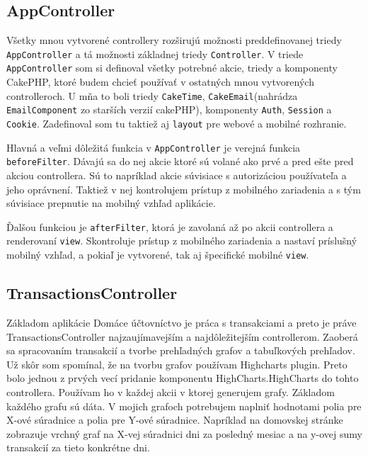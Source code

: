 \documentclass[12pt,oneside]{book}
\begin{document}
\subsection{AppController}
Všetky mnou vytvorené controllery rozširujú možnosti preddefinovanej triedy \texttt{AppController} a tá možnosti základnej triedy \texttt{Controller}. V triede \texttt{AppController} som si definoval všetky potrebné akcie, triedy a komponenty CakePHP, ktoré budem chcieť používať v ostatných mnou vytvorených controlleroch. U mňa to boli triedy \texttt{CakeTime}, \texttt{CakeEmail}(nahrádza \texttt{EmailComponent} zo starších verzií cakePHP), komponenty \texttt{Auth}, \texttt{Session} a \texttt{Cookie}. Zadefinoval som tu taktiež aj \texttt{layout} pre webové a mobilné rozhranie.

Hlavná a veľmi dôležitá funkcia v \texttt{AppController} je verejná funkcia \texttt{beforeFilter}. Dávajú sa do nej akcie ktoré sú volané ako prvé a pred ešte pred akciou controllera. Sú to napríklad akcie súvisiace s autorizáciou používateľa a jeho oprávnení. Taktiež v nej kontrolujem prístup z mobilného zariadenia a s tým súvisiace prepnutie na mobilný vzhľad aplikácie.

Ďalšou funkciou je \texttt{afterFilter}, ktorá je zavolaná až po akcii controllera a renderovaní \texttt{view}. Skontroluje prístup z mobilného zariadenia a nastaví príslušný mobilný vzhľad, a pokiaľ je vytvorené, tak aj špecifické mobilné \texttt{view}.


\subsection{TransactionsController}
Základom aplikácie Domáce účtovníctvo je práca s transakciami a preto je práve TransactionsController najzaujímavejším a najdôležitejším controllerom. Zaoberá sa spracovaním transakcií a tvorbe prehľadných grafov a tabuľkových prehľadov. Už skôr som spomínal, že na tvorbu grafov používam Highcharts plugin. Preto bolo jednou z prvých vecí pridanie komponentu HighCharts.HighCharts do tohto controllera. Používam ho v každej akcii v ktorej generujem grafy. Základom každého grafu sú dáta. V mojich grafoch potrebujem naplniť hodnotami polia pre X-ové súradnice a polia pre Y-ové súradnice. Napríklad na domovskej stránke zobrazuje vrchný graf na X-vej súradnici dni za posledný mesiac a na y-ovej sumy transakcií za tieto konkrétne dni. 
\end{document}
